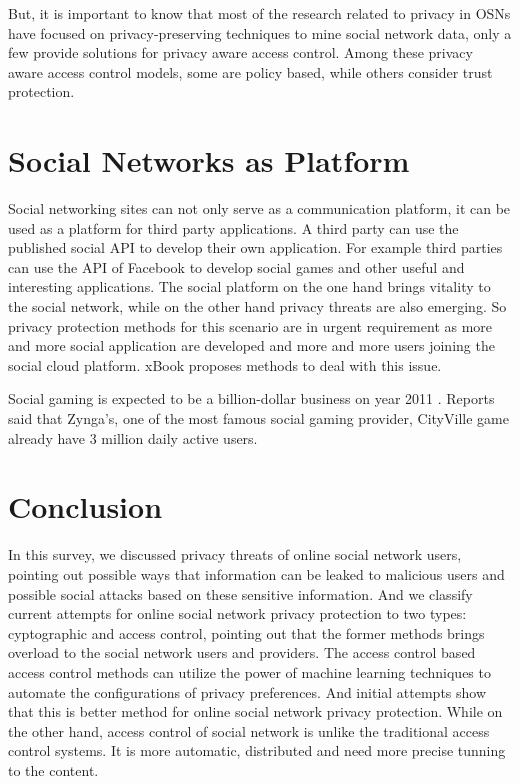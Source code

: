 \documentclass[12pt]{article}
\begin{document}
But, it is important to know that most of the research related to
privacy in OSNs have focused on privacy-preserving techniques to mine
social network data, only a few provide solutions for privacy aware
access control. Among these privacy aware access control models, some
are policy based, while others consider trust protection. 

\section{Social Networks as Platform \label{sec:platform}}
Social networking sites can not only serve as a communication
platform, it can be used as a platform for third party applications. A
third party can use the published social API to develop their own
application. For example third parties can use the API of Facebook to
develop social games and other useful and interesting
applications. The social platform on the one hand brings vitality to
the social network, while on the other hand privacy threats are also
emerging. So privacy protection methods for this scenario are in
urgent requirement as more and more social application are developed
and more and more users joining the social cloud
platform. xBook\cite{xbook-social-platform} proposes methods to deal
with this issue. 

Social gaming is expected to be a billion-dollar business on year 2011
\cite{billion-dollar-social-gaming}. Reports \cite{zynga} said that
Zynga's, one of the most famous social gaming provider, CityVille game
already have 3 million daily active users. 

\section{Conclusion \label{sec:summary}}
In this survey, we discussed privacy threats of online social network
users, pointing out possible ways that information can be leaked to
malicious users and possible social attacks based on these sensitive
information. And we classify current attempts for online social
network privacy protection to two types: cyptographic and access
control, pointing out that the former methods brings overload to the
social network users and providers. The access control based access
control methods can utilize the power of machine learning techniques
to automate the configurations of privacy preferences. And initial
attempts show that this is better method for online social network
privacy protection. While on the other hand, access control of social
network is unlike the traditional access control systems. It is more
automatic, distributed and need more precise tunning to the content. 
\end{document}
